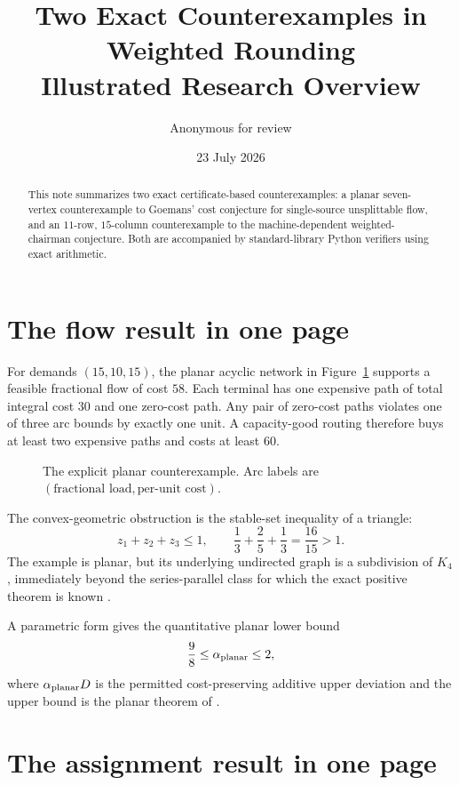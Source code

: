\documentclass[11pt]{article}
\title{Two Exact Counterexamples in Weighted Rounding\\
Illustrated Research Overview}
\author{Anonymous for review}
\date{23 July 2026}
\begin{document}
\maketitle

\begin{abstract}
This note summarizes two exact certificate-based counterexamples: a planar
seven-vertex counterexample to Goemans' cost conjecture for single-source
unsplittable flow, and an $11$-row, $15$-column counterexample to the
machine-dependent weighted-chairman conjecture.  Both are accompanied by
standard-library Python verifiers using exact arithmetic.
\end{abstract}



\section{The flow result in one page}

For demands $(15,10,15)$, the planar acyclic network in
Figure~\ref{fig:network} supports a feasible fractional flow of cost $58$.
Each terminal has one expensive path of total integral cost $30$ and one
zero-cost path.  Any pair of zero-cost paths violates one of three arc bounds
by exactly one unit.  A capacity-good routing therefore buys at least two
expensive paths and costs at least $60$.

\begin{figure}[ht]
\centering
\resizebox{.84\textwidth}{!}{}
\caption{The explicit planar counterexample.  Arc labels are
$(\text{fractional load},\text{per-unit cost})$.}
\label{fig:network}
\end{figure}

The convex-geometric obstruction is the stable-set inequality of a triangle:
\[
 z_1+z_2+z_3\le1,
 \qquad
 \frac13+\frac25+\frac13=\frac{16}{15}>1.
\]
The example is planar, but its underlying undirected graph is a subdivision
of $K_4$, immediately beyond the series-parallel class for which the exact
positive theorem is known \citep{AlmoghrabiSkutellaWarode2024}.

A parametric form gives the quantitative planar lower bound
\[
 \frac98\le\alpha_{\rm planar}\le2,
\]
where $\alpha_{\rm planar}D$ is the permitted cost-preserving additive upper
deviation and the upper bound is the planar theorem of
\citet{TraubVargasKochZenklusen2024}.

\section{The assignment result in one page}
\end{document}
